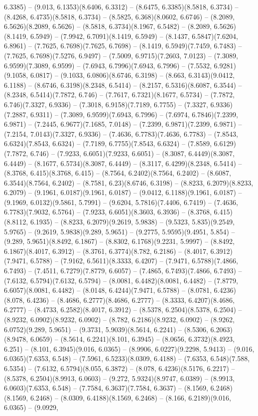 6.3385) -- (9.013, 6.1353)(8.6406, 6.3312) -- (8.6475, 6.3385)(8.5818, 6.3734) -- (8.4268, 6.4735)(8.5818, 6.3734) -- (8.5825, 6.368)(8.0602, 6.6746) -- (8.2089, 6.5626)(8.2089, 6.5626) -- (8.5818, 6.3734)(8.1967, 6.5482) -- (8.2089, 6.5626)(8.1419, 6.5949) -- (7.9942, 6.7091)(8.1419, 6.5949) -- (8.1437, 6.5847)(7.6204, 6.8961) -- (7.7625, 6.7698)(7.7625, 6.7698) -- (8.1419, 6.5949)(7.7459, 6.7483) -- (7.7625, 6.7698)(7.5276, 6.9497) -- (7.5009, 6.9715)(7.2603, 7.0123) -- (7.3089, 6.9599)(7.3089, 6.9599) -- (7.6943, 6.7996)(7.6943, 6.7996) -- (7.5532, 6.9281)(9.1058, 6.0817) -- (9.1033, 6.0806)(8.6746, 6.3198) -- (8.663, 6.3143)(9.0412, 6.1188) -- (8.6746, 6.3198)(8.2348, 6.5414) -- (8.2157, 6.5316)(8.6087, 6.3544) -- (8.2348, 6.5414)(7.7872, 6.746) -- (7.7617, 6.7321)(8.1677, 6.5734) -- (7.7872, 6.746)(7.3327, 6.9336) -- (7.3018, 6.9158)(7.7189, 6.7755) -- (7.3327, 6.9336)(7.2887, 6.9311) -- (7.3089, 6.9599)(7.6943, 6.7996) -- (7.6974, 6.7846)(7.2399, 6.9871) -- (7.2445, 6.9677)(7.1685, 7.0148) -- (7.2399, 6.9871)(7.2399, 6.9871) -- (7.2154, 7.0143)(7.3327, 6.9336) -- (7.4636, 6.7783)(7.4636, 6.7783) -- (7.8543, 6.6324)(7.8543, 6.6324) -- (7.7189, 6.7755)(7.8543, 6.6324) -- (7.8589, 6.6129)(7.7872, 6.746) -- (7.9233, 6.6051)(7.9233, 6.6051) -- (8.3087, 6.4449)(8.3087, 6.4449) -- (8.1677, 6.5734)(8.3087, 6.4449) -- (8.3117, 6.4299)(8.2348, 6.5414) -- (8.3768, 6.415)(8.3768, 6.415) -- (8.7564, 6.2402)(8.7564, 6.2402) -- (8.6087, 6.3544)(8.7564, 6.2402) -- (8.7581, 6.23)(8.6746, 6.3198) -- (8.8233, 6.2079)(8.8233, 6.2079) -- (9.1961, 6.0187)(9.1961, 6.0187) -- (9.0412, 6.1188)(9.1961, 6.0187) -- (9.1969, 6.0132)(9.5861, 5.7991) -- (9.6204, 5.7816)(7.4406, 6.7419) -- (7.4636, 6.7783)(7.9032, 6.5764) -- (7.9233, 6.6051)(8.3603, 6.3936) -- (8.3768, 6.415)(8.8112, 6.1935) -- (8.8233, 6.2079)(9.2619, 5.9838) -- (9.5323, 5.835)(9.2549, 5.9765) -- (9.2619, 5.9838)(9.289, 5.9651) -- (9.2775, 5.9595)(9.4951, 5.854) -- (9.289, 5.9651)(8.8492, 6.1867) -- (8.8302, 6.1768)(9.2231, 5.9997) -- (8.8492, 6.1867)(8.4017, 6.3912) -- (8.3761, 6.3774)(8.782, 6.2186) -- (8.4017, 6.3912)(7.9471, 6.5788) -- (7.9162, 6.5611)(8.3333, 6.4207) -- (7.9471, 6.5788)(7.4866, 6.7493) -- (7.4511, 6.7279)(7.8779, 6.6057) -- (7.4865, 6.7493)(7.4866, 6.7493) -- (7.6132, 6.5794)(7.6132, 6.5794) -- (8.0081, 6.4482)(8.0081, 6.4482) -- (7.8779, 6.6057)(8.0081, 6.4482) -- (8.0148, 6.4244)(7.9471, 6.5788) -- (8.0781, 6.4236)(8.078, 6.4236) -- (8.4686, 6.2777)(8.4686, 6.2777) -- (8.3333, 6.4207)(8.4686, 6.2777) -- (8.4733, 6.2582)(8.4017, 6.3912) -- (8.5378, 6.2504)(8.5378, 6.2504) -- (8.9232, 6.0902)(8.9232, 6.0902) -- (8.782, 6.2186)(8.9232, 6.0902) -- (8.9262, 6.0752)(9.289, 5.9651) -- (9.3731, 5.9039)(8.5614, 6.2241) -- (8.5306, 6.2063)(8.9478, 6.0659) -- (8.5614, 6.2241)(8.101, 6.3945) -- (8.0656, 6.3732)(8.4923, 6.251) -- (8.101, 6.3945)(9.016, 6.0365) -- (8.9906, 6.0227)(9.2298, 5.9413) -- (9.016, 6.0365)(7.6353, 6.548) -- (7.5961, 6.5233)(8.0309, 6.4188) -- (7.6353, 6.548)(7.588, 6.5354) -- (7.6132, 6.5794)(8.055, 6.3872) -- (8.078, 6.4236)(8.5176, 6.2217) -- (8.5378, 6.2504)(8.9913, 6.0603) -- (9.272, 5.9324)(8.9747, 6.0389) -- (8.9913, 6.0603)(7.6353, 6.548) -- (7.7584, 6.3637)(7.7584, 6.3637) -- (8.1569, 6.2468)(8.1569, 6.2468) -- (8.0309, 6.4188)(8.1569, 6.2468) -- (8.166, 6.2189)(9.016, 6.0365) -- (9.0929, 